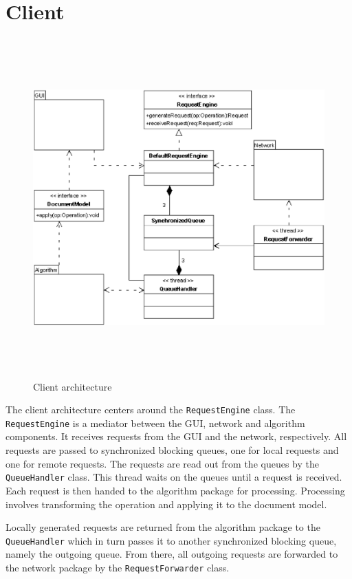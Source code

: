 \section{Client}
\begin{figure}[H]
\centering
\includegraphics[height=13.04cm,width=15.46cm]{../../images/algo-impl/client_diagram.eps}
\caption{Client architecture}
\label{Client architecture}
\end{figure}

The client architecture centers around the \texttt{RequestEngine} class. The \texttt{RequestEngine} is a mediator between the GUI, network and algorithm components. It receives requests from the GUI and the network, respectively. All requests are passed to synchronized blocking queues, one for local requests and one for remote requests. The requests are read out from the queues by the \texttt{QueueHandler} class. This thread waits on the queues until a request is received. Each request is then handed to the algorithm package for processing. Processing involves transforming the operation and applying it to the document model. 

Locally generated requests are returned from the algorithm package to the \texttt{QueueHandler} which in turn passes it to another synchronized blocking queue, namely the outgoing queue. From there, all outgoing requests are forwarded to the network package by the \texttt{RequestForwarder} class. 

